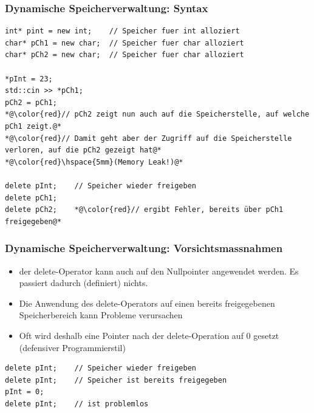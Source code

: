 \subsubsection{Dynamische Speicherverwaltung: Syntax}
\label{sec:Dynamische Speicherverwaltung: Syntax}
\noindent
\begin{minipage}{\linewidth}
\begin{lstlisting}
int* pint = new int;	// Speicher fuer int alloziert
char* pCh1 = new char;	// Speicher fuer char alloziert
char* pCh2 = new char;	// Speicher fuer char alloziert

*pInt = 23;
std::cin >> *pCh1;
pCh2 = pCh1;
*@\color{red}// pCh2 zeigt nun auch auf die Speicherstelle, auf welche pCh1 zeigt.@*
*@\color{red}// Damit geht aber der Zugriff auf die Speicherstelle verloren, auf die pCh2 gezeigt hat@*
*@\color{red}\hspace{5mm}(Memory Leak!)@*

delete pInt;	// Speicher wieder freigeben
delete pCh1;
delete pCh2;	*@\color{red}// ergibt Fehler, bereits über pCh1 freigegeben@*
\end{lstlisting}
\end{minipage}

\subsubsection{Dynamische Speicherverwaltung: Vorsichtsmassnahmen}
\label{sec:Dynamische Speicherverwaltung: Vorsichtsmassnahmen}
\begin{itemize}
	\item der delete-Operator kann auch auf den Nullpointer angewendet werden. Es passiert dadurch (definiert) nichts.
	\item Die Anwendung des delete-Operators auf einen  bereits freigegebenen Speicherbereich kann Probleme verursachen
	\item Oft wird deshalb eine Pointer nach der delete-Operation auf 0 gesetzt (defensiver Programmierstil)
\end{itemize}
\noindent
\begin{minipage}{\linewidth}
\begin{lstlisting}
delete pInt;	// Speicher wieder freigeben
delete pInt;	// Speicher ist bereits freigegeben
pInt = 0;
delete pInt;	// ist problemlos
\end{lstlisting}
\end{minipage}

